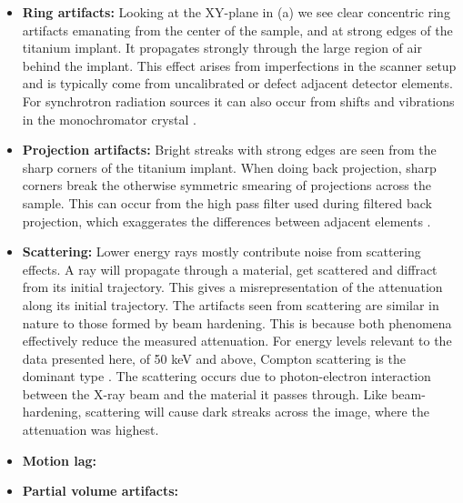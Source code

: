 \begin{itemize}
  \item \textbf{Ring artifacts:} Looking at the XY-plane in
  	(a) we see clear concentric ring artifacts emanating
	from the center of the sample, and at strong edges of the
	titanium implant. It propagates strongly through the large
	region of air behind the implant. This effect arises from
	imperfections in the scanner setup and is typically come from
	uncalibrated or defect adjacent detector elements. For
	synchrotron radiation sources it can also occur from shifts and
	vibrations in the monochromator crystal \citep{ringartefacts}.

  \item \textbf{Projection artifacts:} Bright streaks with strong edges are
	seen from the sharp corners of the titanium implant. When doing back
	projection, sharp corners break the otherwise symmetric
	smearing of projections across the sample.  This can occur from
	the high pass filter used during filtered back projection,
	which exaggerates the differences between adjacent elements
	\citep{ctnoise}.

  \item \textbf{Scattering:} Lower energy rays mostly contribute noise
      from scattering effects. A ray will propagate through a material, get
      scattered and diffract from its initial trajectory. This gives a
      misrepresentation of the attenuation along its initial trajectory. The
      artifacts seen from scattering are similar in nature to those formed by
      beam hardening. This is because both phenomena effectively reduce the
      measured attenuation. For energy levels relevant to the data presented
      here, of 50 keV and above, Compton scattering is the dominant type
      \citep{Compton}. The scattering occurs due to photon-electron interaction
      between the X-ray beam and the material it passes through. Like
      beam-hardening, scattering will cause dark streaks across the image,
      where the attenuation was highest.

      \citep{attenuation-cross-sections}


   \item \textbf{Motion lag:}
   \item \textbf{Partial volume artifacts:}
\end{itemize}

